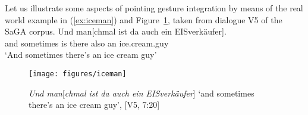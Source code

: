 \documentclass[output=paper
 	        ,biblatex
                ,babelshorthands
                ,newtxmath
                ,draftmode
                ,colorlinks, citecolor=brown
]{langscibook}
\begin{document}
Let us illustrate some aspects of pointing gesture integration by means of the real world example in (\ref{ex:iceman}) and Figure~\ref{fig:iceman}, taken from dialogue V5 of the SaGA corpus. %
%
\ea \label{ex:iceman}
\gll Und man[chmal ist da auch ein {EISverkäufer}]. \\
     and sometimes is there also an ice.cream.guy \\
\glt \enquote*{And sometimes there's an ice cream guy}
\z 

\begin{figure}[tb]
  \centering
  \texttt{[image: figures/iceman]}
  \caption[Ice cream guy]{\textit{Und man}[\textit{chmal ist da auch ein EISverkäufer}] \enquote*{and sometimes there's an ice cream guy}, [V5, 7:20]}
  \label{fig:iceman}
\end{figure}
\end{document}
